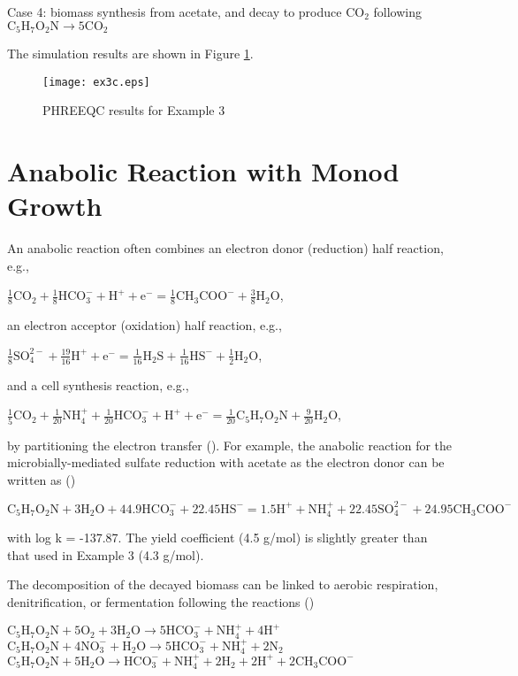 \documentclass[12pt, a4paper]{article}
\begin{document}
Case 4: biomass synthesis from acetate, and decay to produce $\mathrm{CO_2}$ following  $\mathrm{C_5H_7O_2N \rightarrow 5 CO_2}$

The simulation results are shown in Figure \ref{Fig2}.

\begin{figure}[h]
\centering
\texttt{[image: ex3c.eps]}
\caption{PHREEQC results for Example 3}
\label{Fig2}
\end{figure}

\section{Anabolic Reaction with Monod Growth}
An anabolic reaction often combines an electron donor (reduction) half reaction, e.g., 
\begin{center}
$\mathrm{ \frac{1}{8}CO_2 + \frac{1}{8}HCO_3^- + H^+ + e^- = \frac{1}{8}CH_3COO^- + \frac{3}{8} H_2O}$,
\end{center}

an electron acceptor (oxidation) half reaction, e.g., 
\begin{center}
$\mathrm{\frac{1}{8}SO_4^{2-} + \frac{19}{16}H^+ + e^- = \frac{1}{16}H_2S + \frac{1}{16}HS^- + \frac{1}{2}H_2O }$,
\end{center}

and a cell synthesis reaction, e.g., 
\begin{center}
$\mathrm{\frac{1}{5}CO_2+\frac{1}{20}NH_4^+ + \frac{1}{20}HCO_3^- + H^+ + e^- = \frac{1}{20}C_5H_7O_2N + \frac{9}{20}H_2O}$,
\end{center}

by partitioning the electron transfer (\cite{rittmann2001environmental}). For example, the anabolic reaction for the microbially-mediated sulfate reduction with acetate as the electron donor can be written as (\cite{Istok20101})

\begin{center}
$\mathrm{C_5H_7O_2N + 3 H_2O + 44.9 HCO_3^- + 22.45 HS^- = 1.5 H^+ + NH_4^+ + 22.45 SO_4^{2-} + 24.95 CH_3COO^-}$
\end{center}
with log k = -137.87. The yield coefficient (4.5 g/mol) is slightly greater than that used in Example 3 (4.3 g/mol).

The decomposition of the decayed biomass can be linked to aerobic respiration, denitrification, or fermentation following the reactions (\cite{Jin20111})

\begin{center}
$\mathrm{C_5H_7O_2N + 5 O_2 + 3 H_2O \rightarrow 5 HCO_3^- + NH_4^+ + 4H^+}$\\
$\mathrm{C_5H_7O_2N + 4 NO_3^- + H_2O \rightarrow 5 HCO_3^- + NH_4^+ + 2N_2}$\\
$\mathrm{C_5H_7O_2N + 5 H_2O \rightarrow HCO_3^- + NH_4^+ + 2H_2 + 2H^+ + 2 CH_3COO^-}$
\end{center}
\end{document}
